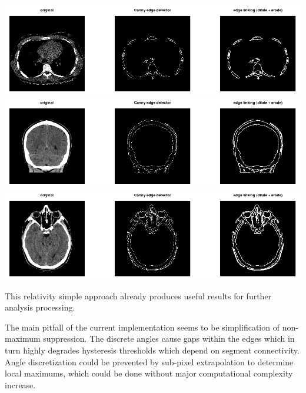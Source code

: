 \documentclass[fleqn,moreauthors,10pt]{ds_report}
\begin{document}
\newpage\noindent
\includegraphics[width=\linewidth]{004.png}
\includegraphics[width=\linewidth]{005.png}
\includegraphics[width=\linewidth]{006.png}

\vspace{2em}
This relativity simple approach already produces useful results for further analysis processing.

The main pitfall of the current implementation seems to be simplification of non-maximum suppression. The discrete angles cause gaps within the edges which in turn highly degrades hysteresis thresholds which depend on segment connectivity. Angle discretization could be prevented by sub-pixel extrapolation to determine local maximums, which could be done without major computational complexity increase.



\end{document}
